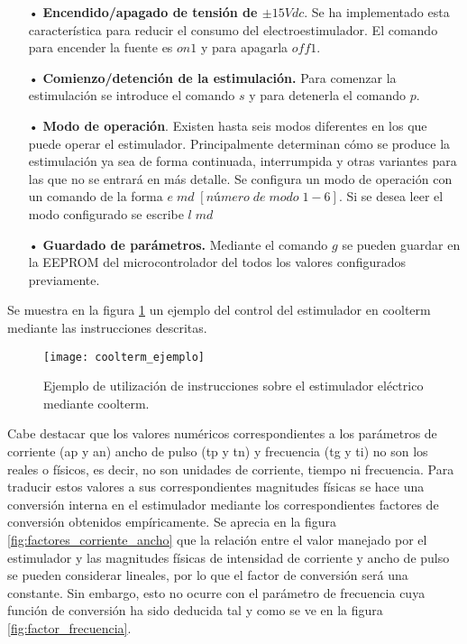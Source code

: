 \begin{itemize}
\item[•] \textbf{Encendido/apagado de tensión de $\pm15Vdc$}. Se ha implementado esta característica para reducir el consumo del electroestimulador. El comando para encender la fuente es $on1$ y para apagarla $off1$.
\item[•] \textbf{Comienzo/detención de la estimulación.} Para comenzar la estimulación se introduce el comando $s$ y para detenerla el comando $p$.
\item[•] \textbf{Modo de operación}. Existen hasta seis modos diferentes en los que puede operar el estimulador. Principalmente determinan cómo se produce la estimulación ya sea de forma continuada, interrumpida y otras variantes para las que no se entrará en más detalle. Se configura un modo de operación con un comando de la forma $e\;md\;[número\;de\;modo\;1-6]$. Si se desea leer el modo configurado se escribe $l\;md$
\item[•] \textbf{Guardado de parámetros.} Mediante el comando $g$ se pueden guardar en la EEPROM del microcontrolador del todos los valores configurados previamente.
\end{itemize}

Se muestra en la figura \ref{fig:coolterm_ejemplo} un ejemplo del control del estimulador en coolterm mediante las instrucciones descritas.\\

\begin{figure}[!htb]
\centering
\texttt{[image: coolterm\_ejemplo]}
  \caption{Ejemplo de utilización de instrucciones sobre el estimulador eléctrico mediante coolterm.}\label{fig:coolterm_ejemplo}
\end{figure}

Cabe destacar que los valores numéricos correspondientes a los parámetros de corriente (ap y an) ancho de pulso (tp y tn) y frecuencia (tg y ti) no son los reales o físicos, es decir, no son unidades de corriente, tiempo ni frecuencia. Para traducir estos valores a sus correspondientes magnitudes físicas se hace una conversión interna en el estimulador mediante los correspondientes factores de conversión obtenidos empíricamente. Se aprecia en la figura \ref{fig:factores_corriente_ancho} que la relación entre el valor manejado por el estimulador y las magnitudes físicas de intensidad de corriente y ancho de pulso se pueden considerar lineales, por lo que el factor de conversión será una constante. Sin embargo, esto no ocurre con el parámetro de frecuencia cuya función de conversión ha sido deducida tal y como se ve en la figura \ref{fig:factor_frecuencia}.\\

